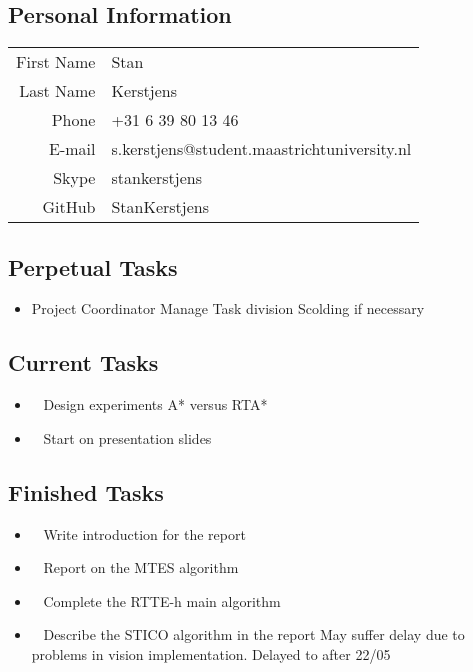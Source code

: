 \subsection{Personal Information}
\begin{table}[h!]
	\begin{tabular}{rl}
	First Name 	& Stan\\
	Last Name	& Kerstjens\\
	Phone		& +31 6 39 80 13 46\\
	E-mail		& s.kerstjens@student.maastrichtuniversity.nl\\
	Skype		& stankerstjens\\
	GitHub		& StanKerstjens
\end{tabular}
\end{table}

\subsection{Perpetual Tasks}
\begin{itemize}
	\item Project Coordinator
		\subitem Manage Task division
		\subitem Scolding if necessary
\end{itemize}

\subsection{Current Tasks}
\begin{itemize}
	\item~
		Design experiments
	\subitem A* versus RTA*
	\item~
		Start on presentation slides
\end{itemize}

\subsection{Finished Tasks}
\begin{itemize}
	\item~\marginpar{}
		Write introduction for the report
	\item~
		Report on the MTES algorithm
	\item~
		Complete the RTTE-h main algorithm
	\item~
	Describe the STICO algorithm in the report
		\subitem May suffer delay due to problems in vision implementation.
		\subitem Delayed to after 22/05
\end{itemize}